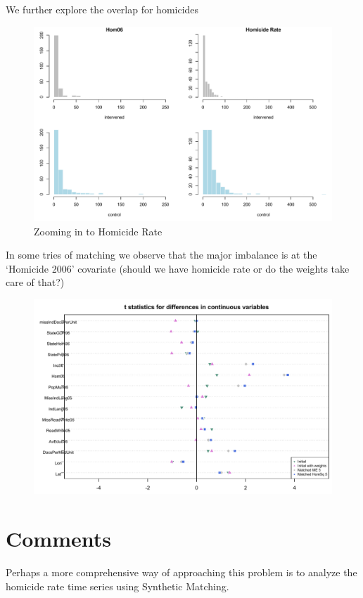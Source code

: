 \documentclass{article}[11 pt]
\begin{document}
We further explore the overlap for homicides
\begin{figure}[ht]

    \centering
        \includegraphics[scale=0.6]{ZoomHom.pdf}
\caption{Zooming in to Homicide Rate}
\label{initBalance2}
\end{figure}

In some tries of matching we observe that the major imbalance is at the `Homicide 2006' covariate (should we have homicide rate or do the weights take care of that?)



\begin{figure}[ht]
    \centering
        \includegraphics[scale=0.5]{MEloveplot.pdf}
\end{figure}

\section{Comments}
Perhaps a more comprehensive way of approaching this problem is to analyze the homicide rate time series using Synthetic Matching.

	
\end{document}
